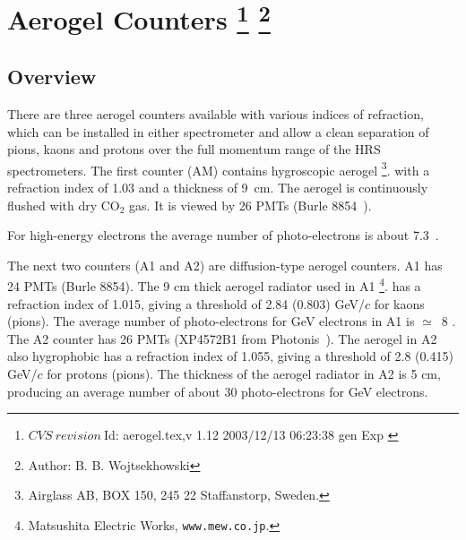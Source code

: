 \chapter[Aerogel \Cherenkov{} Counter]{Aerogel \Cherenkov{} Counters
\footnote{
  $CVS~revision~ $Id: aerogel.tex,v 1.12 2003/12/13 06:23:38 gen Exp $ $
}
\footnote{Author: B. B. Wojtsekhowski }
}
\label{chap:hrs-aerogel}

\section{Overview}

There are three aerogel \Cherenkov{} counters available with various indices
of refraction, which can be installed in either spectrometer 
and allow a clean separation of pions, kaons and protons over 
the full momentum range of the HRS spectrometers.
The first counter (AM) contains hygroscopic aerogel
\footnote{Airglass AB, BOX 150, 245 22 Staffanstorp, Sweden.}.
with a refraction index of 1.03 and a thickness of 9~cm. 
The aerogel is continuously flushed with dry CO$_{2}$ gas.  
It is viewed by 26 PMTs (Burle 8854~\cite{BurleInd}).

For high-energy electrons the average 
number of photo-electrons is about 7.3~\cite{Brash:2002vn}.

The next two counters (A1 and A2) are diffusion-type aerogel counters.
A1 has 24 PMTs (Burle 8854). The 9 cm thick aerogel radiator used in A1
\footnote{ Matsushita Electric Works, {\tt www.mew.co.jp}.}.
has a refraction index of 1.015, giving a threshold of 2.84 (0.803) GeV/$c$ for
kaons (pions). The average number of photo-electrons for GeV electrons
in A1 is $\simeq$~8%
.
 The A2 counter has 26 PMTs
(XP4572B1 from Photonis~\cite{PhotonisInd}).
The aerogel in A2 also hygrophobic has a refraction index of 1.055, 
giving a threshold of 2.8 (0.415) GeV/$c$ for protons (pions). 
The thickness of the aerogel radiator in A2 is 5 cm, producing an average
number of about 30 photo-electrons for GeV electrons.


